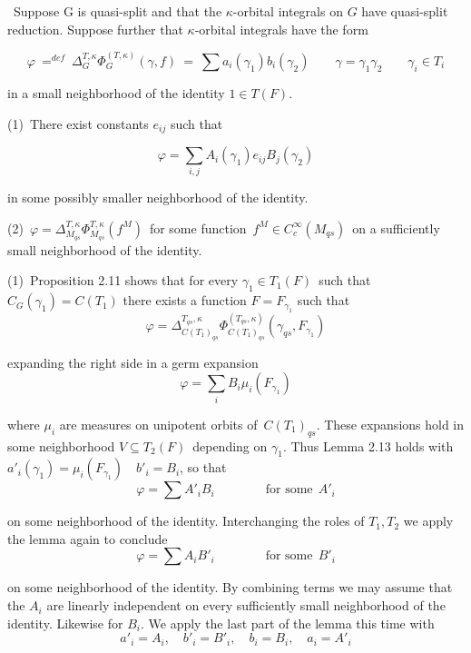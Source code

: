 \   Suppose G is quasi-split and that the $\kappa$-orbital integrals on  $G$  have
quasi-split reduction.  Suppose further that $\kappa$-orbital integrals have
the form

$$
\varphi\ {\mathrel{\mathop=^{def}}}\ \Delta_G^{T,\kappa}\Phi^{(T,\kappa)}_G(\gamma,f)\ =\
\sum a_i(\gamma_1)b_i(\gamma_2) \qquad  \gamma = \gamma_1\gamma_2 \qquad 
\gamma_i \in T_i 
$$

\noindent in a small neighborhood of the identity  $1 \in T(F)$.  

\noindent (1)\  There exist constants  $e_{ij}$  such that

$$
\varphi = \sum_{i,j} A_i (\gamma_1)e_{ij} B_j (\gamma_2)
$$

\noindent  in some possibly smaller neighborhood of the identity.

\noindent (2)\ $\varphi = \Delta^{T,\kappa}_{M_{qs}} \Phi^{T,\kappa}_{M_{qs}}(f^M)$\
for some function\ $f^M\in C^\infty_c(M_{qs})$\  on a sufficiently small
neighborhood of the identity.

\endproclaim 

\pagebreak
{}  (1)\ Proposition 2.11 shows that for every  $\gamma_1\in T_1(F)$\ 
such that $C_G(\gamma_1) = C(T_1)$ there exists
a function  $F = F_{\gamma_1}$  such that
$$
\varphi = \Delta^{T_{qs},\kappa}_{C(T_1)_{qs}} \Phi^{(T_{qs},\kappa)}_{C(T_1)_{qs}} (\gamma_{qs}, F_{\gamma_1}) 
$$

\noindent expanding the right side in a germ expansion
$$
\varphi = \sum_i B_i \mu_i(F_{\gamma_1})
$$

\noindent  where  $\mu_i$  are measures on unipotent orbits of\ $C(T_1)_{qs}$.  These expansions hold
in some neighborhood  $V\subseteq T_2(F)$\ depending on  $\gamma_1$.  Thus 
Lemma 2.13 holds with\ $a'_i(\gamma_1) = \mu_i(F_{\gamma_1}) \quad  b'_i = B_i$,
so that
$$
\varphi = \sum A'_iB_i	\qquad \qquad {\text{for~some}} ~~ A'_i
$$

\noindent  on some neighborhood of the identity.  Interchanging the roles of
$T_1,T_2$  we apply the lemma again to conclude
$$
\varphi = \sum A_i B'_i \qquad \qquad {\text{for~some}}~~B'_i
$$

\noindent on some neighborhood of the identity.  By combining terms we may assume
that the  $A_i$  are linearly independent on every    sufficiently small neighborhood
of the identity.  Likewise for  $B_i$.  We apply the last part of the lemma this time
with 
$$
a'_i =  A_i, \quad b'_i = B'_i, \quad b_i =  B_i, \quad a_i =  A'_i
$$

